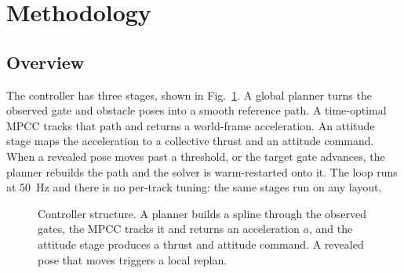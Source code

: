 \documentclass[conference]{IEEEtran}
\begin{document}
\section{Methodology}
\label{sec:method}

\subsection{Overview}
The controller has three stages, shown in Fig.~\ref{fig:pipeline}. A global planner turns the observed gate and obstacle poses into a smooth reference path. A time-optimal MPCC tracks that path and returns a world-frame acceleration. An attitude stage maps the acceleration to a collective thrust and an attitude command. When a revealed pose moves past a threshold, or the target gate advances, the planner rebuilds the path and the solver is warm-restarted onto it. The loop runs at 50~Hz and there is no per-track tuning: the same stages run on any layout.

\begin{figure}[t]
\centering
{}
\caption{Controller structure. A planner builds a spline through the observed gates, the MPCC tracks it and returns an acceleration $a$, and the attitude stage produces a thrust and attitude command. A revealed pose that moves triggers a local replan.}
\label{fig:pipeline}
\end{figure}
\end{document}
